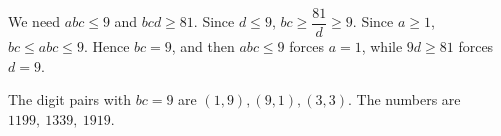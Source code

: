 We need $abc\le9$ and $bcd\ge81$. Since $d\le9$, $bc\ge\dfrac{81}{d}\ge9$. Since $a\ge1$, $bc\le abc\le9$. Hence $bc=9$, and then $abc\le 9$ forces $a=1$, while $9d\ge81$ forces $d=9$.

The digit pairs with $bc=9$ are $(1,9),(9,1),(3,3)$. The numbers are $\boxed{1199,\ 1339,\ 1919}$.
